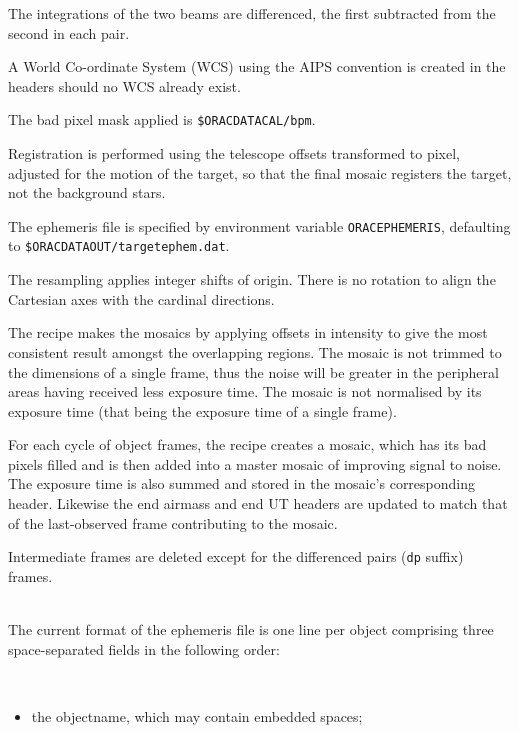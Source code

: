 \documentclass[twoside,11pt]{article}
\renewcommand{\_}{\texttt{\symbol{95}}}
\newcommand{\sstdiytopic}[2]{\goodbreak \item[{\hspace{-0.35em}#1\hspace{-0.35em}:}] \mbox{} \\[1.3ex] #2}
\newcommand{\ssthitemlist}[1]{
  \mbox{} \\
  \vspace{-3.5ex}
  \begin{itemize}
     #1
  \end{itemize}
}
\newcommand{\sstitem}{\item}
\newcommand{\sstdiytopic}[2]{\item[{#1}:]
      \begin{description}
         #2
      \end{description}
      \\
   }
\newcommand{\ssthitemlist}[1]{
      \begin{itemize}
         #1
      \end{itemize}
      \\
   }
\begin{document}
{{{         \sstitem
         The integrations of the two beams are differenced, the first
         subtracted from the second in each pair.

         \sstitem
         A World Co-ordinate System (WCS) using the AIPS convention is
         created in the headers should no WCS already exist.

         \sstitem
         The bad pixel mask applied is {\tt\$ORAC\_DATA\_CAL/bpm}.

         \sstitem
         Registration is performed using the telescope offsets
         transformed to pixel, adjusted for the motion of the target, so
         that the final mosaic registers the target, not the background stars.

         \sstitem
         The ephemeris file is specified by environment variable
         {\tt ORAC\_EPHEMERIS}, defaulting to {\tt\$ORAC\_DATA\_OUT/target\_ephem.dat}.

         \sstitem
         The resampling applies integer shifts of origin.   There is no
         rotation to align the Cartesian axes with the cardinal directions.

         \sstitem
         The recipe makes the mosaics by applying offsets in intensity
         to give the most consistent result amongst the overlapping regions.
         The mosaic is not trimmed to the dimensions of a single frame, thus
         the noise will be greater in the peripheral areas having received
         less exposure time.  The mosaic is not normalised by its exposure
         time (that being the exposure time of a single frame).

         \sstitem
         For each cycle of object frames, the recipe creates a mosaic,
         which has its bad pixels filled and is then added into a master
         mosaic of improving signal to noise.  The exposure time is also
         summed and stored in the mosaic's corresponding header.  Likewise
         the end airmass and end UT headers are updated to match that of the
         last-observed frame contributing to the mosaic.

         \sstitem
         Intermediate frames are deleted except for the differenced pairs
         ({\tt\_dp} suffix) frames.
      }
   }
   \label{mnc_ephem_format}
   \sstdiytopic{
      Ephemeris-file Format
   }{
      The current format of the ephemeris file is one line per object
      comprising three space-separated fields in the following order:
      \ssthitemlist{

         \sstitem
           the objectname, which may contain embedded spaces;

}}}
\end{document}
